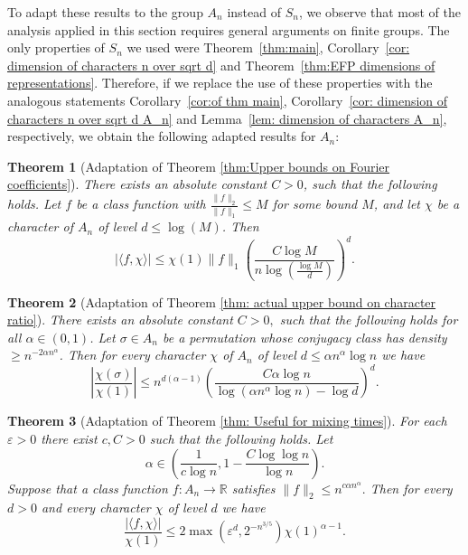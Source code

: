 \documentclass[11pt, letterpaper]{amsart}
\newtheorem{thm}{Theorem}[section]
\newcommand\eps{\varepsilon}
\renewcommand\ge{\geqslant}
\renewcommand\le{\leqslant}
\renewcommand{\epsilon}{\eps}
\begin{document}
To adapt these results to the group $A_n$ instead of $S_n$, we observe that most of the analysis applied in this section requires general arguments on finite groups. The only properties of $S_n$ we used were Theorem~\ref{thm:main}, Corollary~\ref{cor: dimension of characters n over sqrt d} and Theorem~\ref{thm:EFP dimensions of representations}. Therefore, if we replace the use of these properties with the analogous statements Corollary~\ref{cor:of thm main}, Corollary~\ref{cor: dimension of characters n over sqrt d A_n} and Lemma~\ref{lem: dimension of characters A_n}, respectively, we obtain the following adapted results for $A_n$:%
\begin{thm}[Adaptation of Theorem \ref{thm:Upper bounds on Fourier coefficients}]\label{thm:Upper bounds on Fourier coefficients An}
There exists an absolute constant $C>0$, such that the following holds. Let $f$ be a class function with $\frac{\|f\|_2}{\|f\|_1} \le M$ for some bound $M$, and let $\chi$ be a character of $A_n$ of level $d \le  \log(M) $. 
Then 
\[
|\langle f , \chi \rangle| \le  \chi(1)\|f\|_1\left(\frac{C\log M}{n \log \left(\frac{\log M}{d}\right)} \right)^d. 
\]
\end{thm}

\begin{thm}[Adaptation of Theorem \ref{thm: actual upper bound on character ratio}] \label{thm: actual upper bound on character ratio An}
There exists an absolute constant $C>0,$ such that the following holds for all $\alpha \in(0,1)$. Let 
$\sigma\in A_n$ be a permutation whose conjugacy class has density $\ge n^{-2 \alpha n^{\alpha}}$.
Then for every character $\chi$ of $A_n$ of level $d \le \alpha n^{\alpha}\log n$ we have 
\[
\left| \frac{\chi(\sigma)}{\chi(1)}\right|\le  n^{d(\alpha -1)}\left(\frac{C \alpha \log n}{\log (\alpha n^{\alpha} \log n)-\log d}\right)^{d}.
\]
\end{thm}

\begin{thm}[Adaptation of Theorem \ref{thm: Useful for mixing times}]\label{thm: A_n Useful for mixing times}
For each $\epsilon>0$ there exist $c,C>0$ such that the following holds. Let \[\alpha \in\left(\frac{1}{c\log n}, 1-\frac{C\log \log n}{\log n}\right).\] Suppose that a class function $f\colon A_n\to \mathbb{R}$ satisfies $\|f\|_2 \le  n^{c\alpha n^\alpha}.$ Then for every $d>0$ and every character $\chi$ of level $d$ we have 
\[\frac{\left|\langle f,\chi\rangle \right|}{\chi(1)} \le 2\max\left(\epsilon^d, 2^{-n^{3/5}}\right) \chi(1)^{\alpha -1}.\] 
\end{thm}
\end{document}
